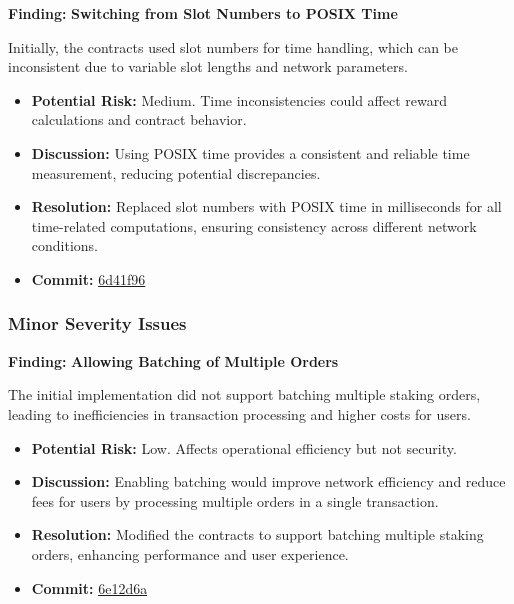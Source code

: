\documentclass{article}
\begin{document}
\begin{moderatebox}
\textbf{Finding:} \textbf{Switching from Slot Numbers to POSIX Time}

Initially, the contracts used slot numbers for time handling, which can be inconsistent due to variable slot lengths and network parameters.

\begin{itemize}[label=$\diamond$]
    \item \textbf{Potential Risk:} Medium. Time inconsistencies could affect reward calculations and contract behavior.
    \item \textbf{Discussion:} Using POSIX time provides a consistent and reliable time measurement, reducing potential discrepancies.
    \item \textbf{Resolution:} Replaced slot numbers with POSIX time in milliseconds for all time-related computations, ensuring consistency across different network conditions.
    \item \textbf{Commit:} \href{https://github.com/MuesliSwapLabs/muesliswap-onchain-staking/commit/6d41f968105b5a7510fa28060a025207c22011db}{6d41f96}
\end{itemize}
\end{moderatebox}

\subsubsection{Minor Severity Issues}

\begin{minorbox}
\textbf{Finding:} \textbf{Allowing Batching of Multiple Orders}

The initial implementation did not support batching multiple staking orders, leading to inefficiencies in transaction processing and higher costs for users.

\begin{itemize}[label=$\diamond$]
    \item \textbf{Potential Risk:} Low. Affects operational efficiency but not security.
    \item \textbf{Discussion:} Enabling batching would improve network efficiency and reduce fees for users by processing multiple orders in a single transaction.
    \item \textbf{Resolution:} Modified the contracts to support batching multiple staking orders, enhancing performance and user experience.
    \item \textbf{Commit:} \href{https://github.com/MuesliSwapLabs/muesliswap-onchain-staking/commit/6e12d6a868619cef1a0cbddfbc862438749cf3d8}{6e12d6a}
\end{itemize}
\end{minorbox}
\end{document}

